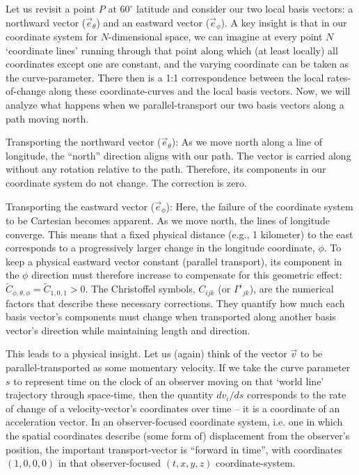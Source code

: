 \documentclass[twocolumn]{article}
\begin{document}
Let us revisit a point $P$ at $60^\circ$ latitude and consider our two
local basis vectors: a northward vector (\(\vec{e}_{\theta}\)) and an
eastward vector (\(\vec{e}_\phi\)). A key insight is that in our
coordinate system for $N$-dimensional space, we can imagine at every
point $N$ `coordinate lines' running through that point along which
(at least locally) all coordinates except one are constant, and the
varying coordinate can be taken as the curve-parameter. There then is
a 1:1 correspondence between the local rates-of-change along these
coordinate-curves and the local basis vectors. Now, we will analyze
what happens when we parallel-transport our two basis vectors along a
path moving north.

Transporting the northward vector (\(\vec{e}_\theta\)): As we move
north along a line of longitude, the ``north'' direction aligns with our
path. The vector is carried along without any rotation relative to the
path. Therefore, its components in our coordinate system do not change.
The correction is zero.

Transporting the eastward vector (\(\vec{e}_\phi\)): Here, the failure
of the coordinate system to be Cartesian becomes apparent. As we move
north, the lines of longitude converge.  This means that a fixed
physical distance (e.g., 1 kilometer) to the east corresponds to a
progressively larger change in the longitude coordinate, \(\phi\). To
keep a physical eastward vector constant (parallel transport), its
component in the \(\phi\) direction must therefore increase to
compensate for this geometric effect: $\tilde
C_{\phi,\theta,\phi}=\tilde C_{1,0,1}>0$. The Christoffel symbols,
\(C_{ijk}\) (or \(\Gamma^{i}{}_{jk}\)), are the numerical factors that
describe these necessary corrections. They quantify how much each
basis vector's components must change when transported along another
basis vector's direction while maintaining length and direction.

This leads to a physical insight. Let us (again) think of the vector
$\vec v$ to be parallel-transported as some momentary velocity. If we
take the curve parameter \(s\) to represent time on the clock of an
observer moving on that `world line' trajectory through space-time,
then the quantity \(dv_i/ds\) corresponds to the rate of change of a
velocity-vector's coordinates over time -- it is a coordinate of an
acceleration vector. In an observer-focused coordinate system,
i.e. one in which the spatial coordinates describe (some form of)
displacement from the observer's position, the important
transport-vector is ``forward in time'', with coordinates $(1,0,0,0)$
in that observer-focused $(t,x,y,z)$ coordinate-system.
\end{document}
